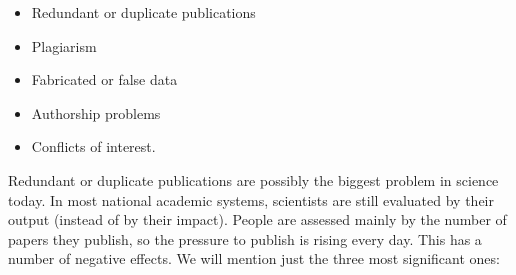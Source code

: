 \documentclass[graybox,envcountchap,sectrefs,UStrade]{svmono}
\begin{document}
\begin{itemize}
  \item Redundant or duplicate publications
  \item Plagiarism
  \item Fabricated or false data
  \item Authorship problems
  \item Conflicts of interest.
\end{itemize}

Redundant or duplicate publications are possibly the biggest problem in science today. In most national academic systems, scientists are still evaluated by their output (instead of by their impact). People are assessed mainly by the number of papers they publish, so the pressure to publish is rising every day. This has a number of negative effects. We will mention just the three most significant ones:
\end{document}
